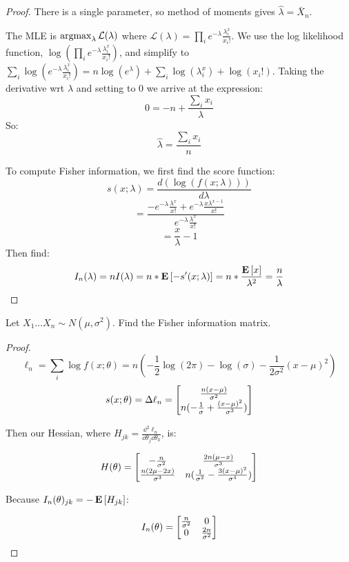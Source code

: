 \documentclass[10pt]{article}
\begin{document}
\begin{proof}
    There is a single parameter, so method of moments gives $\hat{\lambda} = \bar{X}_n$.

    The MLE is $\operatorname*{arg max}_\lambda \mathcal{L}(\lambda)$ where
    $\mathcal{L}(\lambda) = \prod_i e^{-\lambda} \frac{\lambda^x_i}{x_i!}$.
    We use the log likelihood function, $\log(\prod_i e^{-\lambda}
    \frac{\lambda^x_i}{x_i!})$, and simplify to $\sum_i \log(e^{-\lambda}
    \frac{\lambda^x_i}{x_i!}) = n\log(e^{\lambda}) + \sum_i \log(\lambda^x_i) +
    \log(x_i!)$. Taking the derivative wrt $\lambda$ and setting to 0 we arrive
    at the expression:
    \[ 0 = -n + \frac{\sum_i x_i}{\lambda}\]
    So:
    \[ \hat{\lambda} = \frac{\sum_i x_i}{n}\]

    To compute Fisher information, we first find the score function: 
    \[s(x; \lambda) = \frac{d(\log(f(x;\lambda)))}{d\lambda}\]
    \[= \frac{-e^{-\lambda}\frac{\lambda^x}{x!} + e^{-\lambda}\frac{x\lambda^{x-1}}{x!}}{e^{-\lambda}\frac{\lambda^x}{x!}}\]
    \[= \frac{x}{\lambda}-1\]
    Then find:
    \[I_n(\lambda) = nI(\lambda) = n*\operatorname{\mathbf{E}}\left[-s'(x;\lambda)\right] = n *\frac{\operatorname{\mathbf{E}}\left[x\right]}{\lambda^2} = \frac{n}{\lambda}\]
\end{proof}

\setcounter{exercise}{7}
\begin{exercise}
    Let $X_1 \dots X_n \sim N(\mu, \sigma^2)$. Find the Fisher information matrix.
\end{exercise}

\begin{proof}
    \[\ell_n = \sum_i \log f(x; \theta) = n(-\frac{1}{2}\log(2\pi) - \log(\sigma) - \frac{1}{2\sigma^2}(x - \mu)^2)\]
    \[s(x; \theta) = \Delta \ell_n = \begin{bmatrix} \frac{n(x-\mu)}{\sigma^2} \\ n(-\frac{1}{\sigma} + \frac{(x-\mu)^2}{\sigma^3}) \end{bmatrix} \]

    Then our Hessian, where $H_{jk} = \frac{\dd^2 \ell_n}{\dd\theta_j \dd\theta_k}$, is:

    \[H(\theta) = \begin{bmatrix} -\frac{n}{\sigma^2} & \frac{2n(\mu - x)}{\sigma^3} \\ \frac{n(2\mu - 2x)}{\sigma^3} & n(\frac{1}{\sigma^2} - \frac{3(x-\mu)^2}{\sigma^4}) \end{bmatrix}\]

    Because $I_n(\theta)_{jk} = -\operatorname{\mathbf{E}}\left[H_{jk}\right]$:

    \[I_n(\theta) = \begin{bmatrix} \frac{n}{\sigma^2} & 0 \\ 0 & \frac{2n}{\sigma^2} \end{bmatrix}\]
\end{proof}
\end{document}
